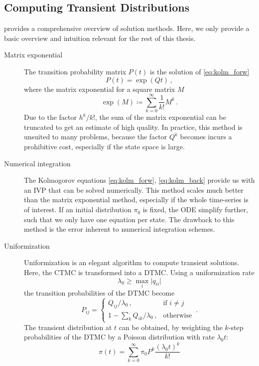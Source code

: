 \subsection{Computing Transient Distributions}
\citet{stewart1994introduction} provides a comprehensive overview of
solution methods.
Here, we only provide a basic overview and intuition relevant for the
rest of this thesis.
\begin{description}
  \item[Matrix exponential]
    The transition probability matrix $P(t)$ is the solution of
    \eqref{eq:kolm_forw}
    \[
      P(t)=\exp(Qt)\,,
    \]
    where the matrix exponential for a square matrix $M$
    \[
      \exp({M})\coloneqq\sum_{k=0}^{\infty}\frac{1}{k!}M^k\,.
    \]
    Due to the factor ${h^k}/{k!}$, the sum of the matrix exponential
    can be truncated to get an estimate
    of high quality. In practice, this method is unsuited to many
    problems, because
    the factor $Q^k$ becomes incurs a prohibitive cost, especially if
    the state space
    is large.
  \item[Numerical integration]
    The Kolmogorov equations \eqref{eq:kolm_forw}, \eqref{eq:kolm_back}
    provide us with an \ac{IVP} that can be solved
    numerically.
    This method scales much better than the matrix exponential method,
    especially if the whole time-series is of interest. If an initial
    distribution
    $\pi_0$ is fixed, the \ac{ODE} simplify further, such that we
    only have one equation
    per state.
    The drawback to this method is the error inherent to numerical
    integration schemes.
  \item[Uniformization]\label{item:uniformization}
    Uniformization is an elegant algorithm to compute transient solutions.
    Here, the \ac{CTMC} is transformed into a \ac{DTMC}.
    Using a uniformization rate \[\lambda_0\geq\max_{i}\lvert q_{ii}\rvert\]
    the transition probabilities of the \ac{DTMC} become
    \[
      P_{ij} =
      \begin{cases}
        Q_{ij} / \lambda_0\,, &\text{if } i\neq j\\
        1 - \sum_k Q_{ik} / \lambda_0\,, &\text{otherwise}
      \end{cases}\,.
    \]
    The transient distribution at $t$ can be obtained, by weighting the $k$-step
    probabilities of the \ac{DTMC} by a Poisson distribution with rate
    $\lambda_0 t$:
    \[
      \pi(t) =
      \sum_{k=0}^{\infty}\pi_0P^k\frac{(\lambda_0 t)^k}{k!}
\]
\end{description}
